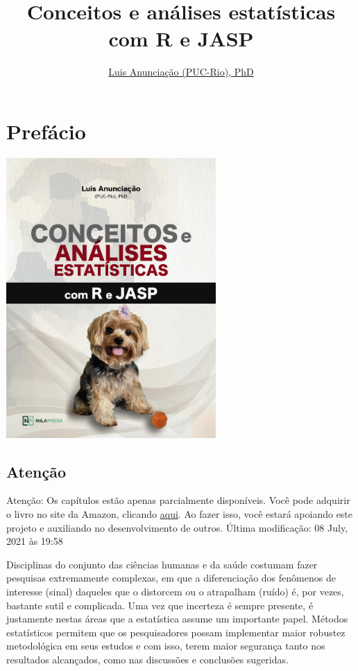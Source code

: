 \documentclass[
]{book}
\title{Conceitos e análises estatísticas com R e JASP}
\author{\href{mailto:\%20luisfca@puc-rio.br}{Luis Anunciação (PUC-Rio), PhD}}
\date{}
\begin{document}
\maketitle

{
\setcounter{tocdepth}{1}
\tableofcontents
}
\hypertarget{prefuxe1cio}{%
\chapter{Prefácio}\label{prefuxe1cio}}

\includegraphics[width=0.6\textwidth,height=\textheight]{./img/capa_jolie_final.jpg}

\hypertarget{atenuxe7uxe3o}{%
\section{Atenção}\label{atenuxe7uxe3o}}

Atenção: Os capítulos estão apenas parcialmente disponíveis. Você pode adquirir o livro no site da Amazon, clicando \href{https://www.amazon.com.br/gp/product/B097CP7T9M?pf_rd_r=RDZC8XYMBC1WY69T0J8K\&pf_rd_p=abb22e6b-8812-4b76-a424-5f0b098d2c90\&pd_rd_r=ceec1911-f409-4acd-ac8f-2d5bc68dac43\&pd_rd_w=wMUzJ\&pd_rd_wg=ZK85a\&ref_=pd_gw_unk}{aqui}. Ao fazer isso, você estará apoiando este projeto e auxiliando no desenvolvimento de outros. Última modificação: 08 July, 2021 às 19:58

Disciplinas do conjunto das ciências humanas e da saúde costumam fazer pesquisas extremamente complexas, em que a diferenciação dos fenômenos de interesse (sinal) daqueles que o distorcem ou o atrapalham (ruído) é, por vezes, bastante sutil e complicada. Uma vez que incerteza é sempre presente, é justamente nestas áreas que a estatística assume um importante papel. Métodos estatísticos permitem que os pesquisadores possam implementar maior robustez metodológica em seus estudos e com isso, terem maior segurança tanto nos resultados alcançados, como nas discussões e conclusões sugeridas.
\end{document}
